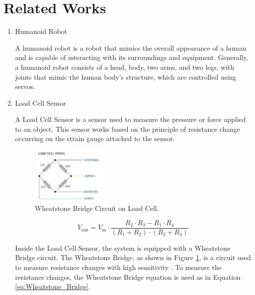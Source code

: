 \section{Related Works}
\label{sec:relatedworks}

\begin{enumerate}[label=\Alph*.]
    \item Humanoid Robot
    \label{subsec:robothumanoid}

    \hspace*{1em} A humanoid robot is a robot that mimics the overall appearance of a human and is capable of interacting with its surroundings and equipment. Generally, a humanoid robot consists of a head, body, two arms, and two legs, with joints that mimic the human body's structure, which are controlled using servos.

    \item Load Cell Sensor
    \label{subsec:sensorloadcell}

    \hspace*{1em} A Load Cell Sensor is a sensor used to measure the pressure or force applied to an object. This sensor works based on the principle of resistance change occurring on the strain gauge attached to the sensor.

    \begin{figure}[h]
        \centering
        \includegraphics[width=0.35\textwidth]{./gambar/wheatstone_loadcell.png}
        \caption{Wheatstone Bridge Circuit on Load Cell\cite{rahman2018autonomous}.}
        \label{fig:Wheatstone_Bridge}
    \end{figure}
    
    \begin{equation}
      V_{\mathrm{out}} = V_{\mathrm{in}} \cdot \frac{R_2 \cdot R_3 - R_1 \cdot R_4}{(R_1 + R_2) \cdot (R_3 + R_4)}
      \label{eq:Wheatstone_Bridge}
    \end{equation}
    
    \hspace*{1em} Inside the Load Cell Sensor, the system is equipped with a Wheatstone Bridge circuit. The Wheatstone Bridge, as shown in Figure \ref{fig:Wheatstone_Bridge}, is a circuit used to measure resistance changes with high sensitivity \cite{rahman2018autonomous}. To measure the resistance changes, the Wheatstone Bridge equation is used as in Equation \ref{eq:Wheatstone_Bridge}. 


\end{enumerate}
